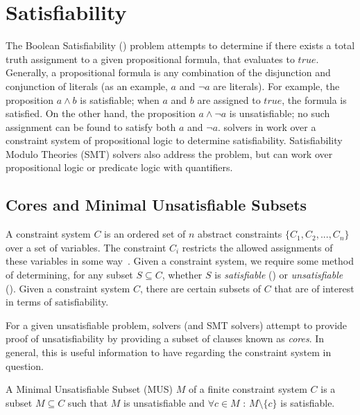 \section{Satisfiability}
\label{sec:sat}
The Boolean Satisfiability (\sat) problem attempts to determine if there exists a total truth assignment to a given propositional formula, that evaluates to $true$. Generally, a propositional formula is any combination of the disjunction and conjunction of literals (as an example, $a$ and $\neg a$ are literals). For example, the proposition $a \land b$ is satisfiable; when $a$ and $b$ are assigned to $true$, the formula is satisfied.  On the other hand, the proposition $a \land \neg a$ is unsatisfiable; no such assignment can be found to satisfy both $a$ and $\neg a$. \sat solvers in work over a constraint system of propositional logic to determine satisfiability. Satisfiability Modulo Theories (SMT) solvers also address the \sat problem, but can work over propositional logic or predicate logic with quantifiers. 

\subsection{\unsat Cores and Minimal Unsatisfiable Subsets}
A constraint system $C$ is an ordered set of $n$ abstract constraints $\{C_1, C_2, ..., C_n\}$ over a set of variables. The constraint $C_i$ restricts the allowed assignments of these variables in some way~\cite{liffiton2016fast}. Given a constraint system, we require some method of determining, for any subset $S \subseteq C$, whether $S$ is \textit{satisfiable} (\sat) or \textit{unsatisfiable} (\unsat). Given a constraint system $C$, there are certain subsets of $C$ that are of interest in terms of satisfiability. %

For a given unsatisfiable problem, \sat solvers (and SMT solvers) attempt to provide proof of unsatisfiability by providing a subset of \unsat clauses known as \textit{\unsat cores}. In general, this is useful information to have regarding the constraint system in question. 

\begin{definition} A Minimal Unsatisfiable Subset (MUS) $M$ of a finite constraint system $C$ is a subset $M \subseteq C$ such that $M$ is unsatisfiable and $\forall c \in M$ : $M \setminus \{c\}$ is satisfiable. 
\end{definition}


